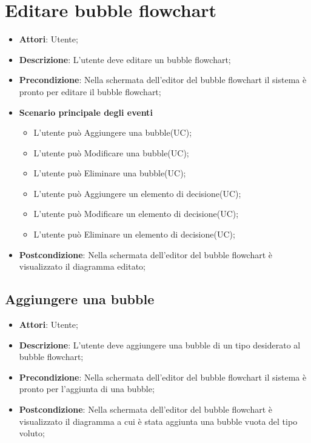 \documentclass[../AnalisiDeiRequisiti.tex]{subfiles}
\begin{document}
	\section{Editare bubble flowchart}
	\begin{itemize}
		\item \textbf{Attori}: Utente;
		\item \textbf{Descrizione}: L'utente deve editare un bubble flowchart;
		\item \textbf{Precondizione}: Nella schermata dell'editor del bubble flowchart il sistema è pronto per editare il bubble flowchart;
		\item \textbf{Scenario principale degli eventi}
		\begin{itemize}
			\item L'utente può Aggiungere una bubble(UC);
			\item L'utente può Modificare una bubble(UC);
			\item L'utente può Eliminare una bubble(UC);
			\item L'utente può Aggiungere un elemento di decisione(UC);
			\item L'utente può Modificare un elemento di decisione(UC);
			\item L'utente può Eliminare un elemento di decisione(UC);
		\end{itemize}
		\item \textbf{Postcondizione}: Nella schermata dell'editor del bubble flowchart è visualizzato il diagramma editato;
	\end{itemize}
	
	\subsection{Aggiungere una bubble}
	\begin{itemize}
		\item \textbf{Attori}: Utente;
		\item \textbf{Descrizione}: L'utente deve aggiungere una bubble di un tipo desiderato al bubble flowchart;
		\item \textbf{Precondizione}: Nella schermata dell'editor del bubble flowchart il sistema è pronto per l'aggiunta di una bubble;
		\item \textbf{Postcondizione}: Nella schermata dell'editor del bubble flowchart è visualizzato il diagramma a cui è stata aggiunta una bubble vuota del tipo voluto;
	\end{itemize}
	
\end{document}
